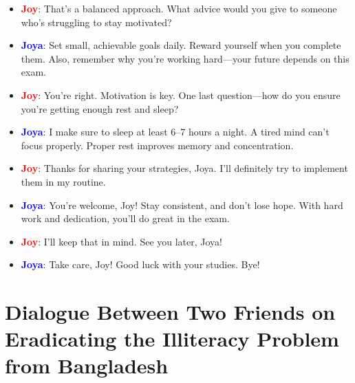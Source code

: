 \documentclass{article}
\begin{document}
\begin{itemize}
    \item \textbf{\textcolor{red}{Joy}}: That’s a balanced approach. What advice would you give to someone who’s struggling to stay motivated?
    \item \textbf{\textcolor{blue}{Joya}}: Set small, achievable goals daily. Reward yourself when you complete them. Also, remember why you’re working hard—your future depends on this exam.
    \item \textbf{\textcolor{red}{Joy}}: You’re right. Motivation is key. One last question—how do you ensure you’re getting enough rest and sleep?
    \item \textbf{\textcolor{blue}{Joya}}: I make sure to sleep at least 6–7 hours a night. A tired mind can’t focus properly. Proper rest improves memory and concentration.
    \item \textbf{\textcolor{red}{Joy}}: Thanks for sharing your strategies, Joya. I’ll definitely try to implement them in my routine.
    \item \textbf{\textcolor{blue}{Joya}}: You’re welcome, Joy! Stay consistent, and don’t lose hope. With hard work and dedication, you’ll do great in the exam.
    \item \textbf{\textcolor{red}{Joy}}: I’ll keep that in mind. See you later, Joya!
    \item \textbf{\textcolor{blue}{Joya}}: Take care, Joy! Good luck with your studies. Bye!
\end{itemize}

\section*{Dialogue Between Two Friends on Eradicating the Illiteracy Problem from Bangladesh}
\end{document}
